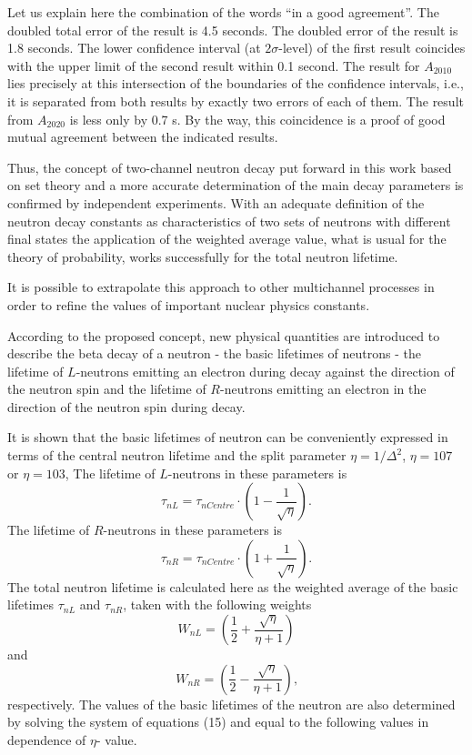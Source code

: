 \documentclass[article]{elsarticle}
\begin{document}
Let us explain here the combination of the words “in a good agreement”. The doubled total error of the result \cite{Yue2013} is 4.5 seconds. The doubled error of the result \cite{Sereb2018} is 1.8 seconds. The lower confidence interval (at $2\sigma \mbox{-level}$) of the first result coincides with the upper limit of the second result within 0.1 second. The result for $A_{2010}$ lies precisely at this intersection of the boundaries of the confidence intervals, i.e., it is separated from both results by exactly two errors of each of them.  The result from $A_{2020}$ is less only by 0.7 s. By the way, this coincidence is a proof of good mutual agreement between the indicated results. 

Thus, the concept of two-channel neutron decay put forward in this work based on set theory and a more accurate determination of the main decay parameters is confirmed by independent experiments. With an adequate definition of the neutron decay constants as characteristics of two sets of neutrons with different final states the application of the weighted average value, what is usual for the theory of probability, works successfully for the total neutron lifetime. 

It is possible to extrapolate this approach to other multichannel processes in order to refine the values of important nuclear physics constants. 

According to the proposed concept, new physical quantities are introduced to describe the beta decay of a neutron - the basic lifetimes of neutrons - the lifetime of $L \mbox{-neutrons}$ emitting an electron during decay against the direction of the neutron spin and the lifetime of $R \mbox{-neutrons}$ emitting an electron in the direction of the neutron spin during decay. 

It is shown that the basic lifetimes of neutron can be conveniently expressed in terms of the central neutron lifetime and the split parameter $\eta=1/\Delta^2$, $\eta=107$ or $\eta=103$,
The lifetime of $L\mbox{-neutrons}$ in these parameters is 
$$
\tau_{nL}=\tau_{nCentre}\cdot \left(1-\frac{1}{\sqrt{\eta}}\right) \mbox{.}
$$
The lifetime of $R\mbox{-neutrons}$ in these parameters is
$$
\tau_{nR}=\tau_{nCentre}\cdot \left(1+\frac{1}{\sqrt{\eta}}\right) \mbox{.}
$$ 
The total neutron lifetime is calculated here as the weighted average of the basic lifetimes $\tau_{nL}$ and $\tau_{nR}$, taken with the following weights 
$$
W_{nL}=\left(\frac{1}{2}+\frac{\sqrt{\eta}}{\eta+1}\right)
$$
and
$$
W_{nR}=\left(\frac{1}{2}-\frac{\sqrt{\eta}}{\eta+1}\right)\mbox{,}
$$
respectively.
The values of the basic lifetimes of the neutron are also determined by solving the system of equations (15) and equal to the following values in dependence of $ \eta$- value.
\end{document}
